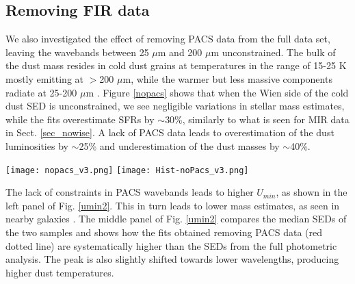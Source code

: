 \documentclass{aa}
\begin{document}
\subsection{Removing FIR data}

We also investigated the effect of removing PACS data from the full data set, leaving the wavebands between 25 $\mu$m and 200 $\mu$m  unconstrained. The bulk of the dust mass resides in cold dust grains at temperatures in the range of 15-25 K mostly emitting at $>$200 $\mu$m, while the warmer but less massive components radiate at 25-200 $\mu$m \citep{ben2,ben3}. Figure \ref{nopacs} shows that when the Wien side of the cold dust SED is unconstrained, we see negligible variations in stellar mass estimates, while the fits overestimate SFRs by $\sim$30\%, similarly to what is seen for MIR data in Sect. \ref{sec_nowise}. A lack of PACS data leads to overestimation of the dust luminosities by $\sim$25\% and underestimation of the dust masses by $\sim$40\%.

\begin{figure*}\begin{center}
\texttt{[image: nopacs\_v3.png]}
\texttt{[image: Hist-noPacs\_v3.png]}
\end{center} 
\caption{Top panels: Dust luminosity (L$_d$, top left), dust mass (M$_d$, top right), SFR (bottom left), and stellar mass (M$_\ast$, bottom right) obtained with CIGALE \citep{nol,boq} from the sample defined in Sect. \ref{sample} using the full photometric coverage (ordinate) or removing PACS data (abscissa). The blue dashed line shows a linear relation between the two quantities and the black cross in the bottom right corner shows the average errors in the fits. Bottom Panels: Histograms of the same quantities.}\label{nopacs}\end{figure*}

The lack of constraints in PACS wavebands leads to higher $U_{min}$, as shown in the left panel of Fig. \ref {umin2}. This in turn leads to lower mass estimates, as seen in nearby galaxies \citep[e.g. Fig. 8 in][]{ani}. The middle panel of Fig. \ref {umin2} compares the median SEDs of the two samples and shows how the fits obtained removing PACS data (red dotted line) are systematically higher than the SEDs from the full photometric analysis. The peak is also slightly shifted towards lower wavelengths, producing higher dust temperatures. 
\end{document}
